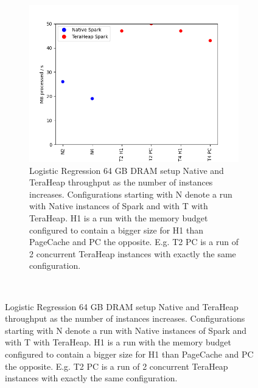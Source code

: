 \begin{figure}[htbp]
\begin{subfigure}[b]{0.48\textwidth}
        \includegraphics[width=\linewidth]{./fig/LOGR_64_THR.png}
    \caption{Logistic Regression 64 GB DRAM setup Native and TeraHeap
    throughput as the number of instances increases. Configurations
    starting with N denote a run with Native instances of Spark and
    with T with TeraHeap. H1 is a run with the memory budget
    configured to contain a bigger size for H1 than PageCache and PC
    the opposite. E.g. T2 PC is a run of 2 concurrent TeraHeap
    instances with exactly the same configuration.}
		\label{fig:logr_64_thr}
        \end{subfigure}\\[1em]
\end{figure}

